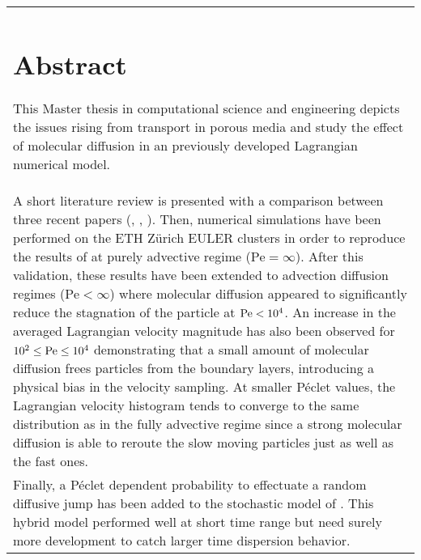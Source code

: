 \begin{tabular}{p{}}
\chapter*{Abstract}

This Master thesis in computational science and engineering depicts the issues rising from transport in porous media and study the effect of molecular diffusion in an previously developed Lagrangian numerical model. \\
A short literature review is presented with a comparison between three recent papers (\citet{Puyguiraud2019}, \citet{Dentz2017}, \citet{Meyer2016}).
Then, numerical simulations have been performed on the ETH Zürich EULER clusters in order to reproduce the results of \citet{Meyer2016} at purely advective regime ($\mathrm{Pe}=\infty$).
After this validation, these results have been extended to advection diffusion regimes ($\mathrm{Pe}<\infty$) where molecular diffusion appeared to significantly reduce the stagnation of the particle at $\mathrm{Pe}<10^4$.
An increase in the averaged Lagrangian velocity magnitude has also been observed for $10^2\leq\mathrm{Pe}\leq10^4$ demonstrating that a small amount of molecular diffusion frees particles from the boundary layers, introducing a physical bias in the velocity sampling.
At smaller Péclet values, the Lagrangian velocity histogram tends to converge to the same distribution as in the fully advective regime since a strong molecular diffusion is able to reroute the slow moving particles just as well as the fast ones.\\
Finally, a Péclet dependent probability to effectuate a random diffusive jump has been added to the stochastic model of \citet{Meyer2016}.
This hybrid model performed well at short time range but need surely more development to catch larger time dispersion behavior.
\end{tabular}
